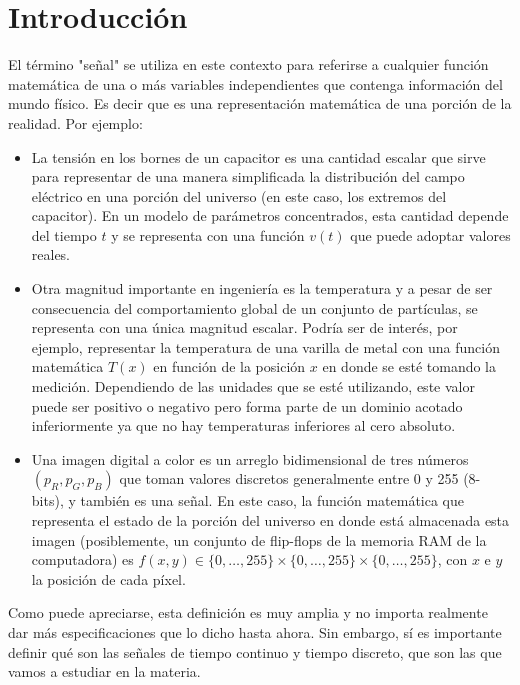 
\section{Introducción}

El término "señal" se utiliza en este contexto para referirse a cualquier función matemática de una o más variables independientes que contenga información del mundo físico. Es decir que es una representación matemática de una porción de la realidad. Por ejemplo:
\begin{itemize}
    \item La tensión en los bornes de un capacitor es una cantidad escalar que sirve para representar de una manera simplificada la distribución del campo eléctrico en una porción del universo (en este caso, los extremos del capacitor). En un modelo de parámetros concentrados, esta cantidad depende del tiempo $t$ y se representa con una función $v(t)$ que puede adoptar valores reales.
    \item Otra magnitud importante en ingeniería es la temperatura y a pesar de ser consecuencia del comportamiento global de un conjunto de partículas, se representa con una única magnitud escalar. Podría ser de interés, por ejemplo, representar la temperatura de una varilla de metal con una función matemática $T(x)$ en función de la posición $x$ en donde se esté tomando la medición. Dependiendo de las unidades que se esté utilizando, este valor puede ser positivo o negativo pero forma parte de un dominio acotado inferiormente ya que no hay temperaturas inferiores al cero absoluto.
    \item Una imagen digital a color es un arreglo bidimensional de tres números $(p_R, p_G, p_B)$ que toman valores discretos generalmente entre 0 y 255 (8-bits), y también es una señal. En este caso, la función matemática que representa el estado de la porción del universo en donde está almacenada esta imagen (posiblemente, un conjunto de flip-flops de la memoria RAM de la computadora) es $f(x,y) \in \{0,\ldots,255\} \times \{0,\ldots,255\} \times \{0,\ldots,255\}$, con $x$ e $y$ la posición de cada píxel. 
\end{itemize}

Como puede apreciarse, esta definición es muy amplia y no importa realmente dar más especificaciones que lo dicho hasta ahora. Sin embargo, sí es importante definir qué son las señales de tiempo continuo y tiempo discreto, que son las que vamos a estudiar en la materia.

